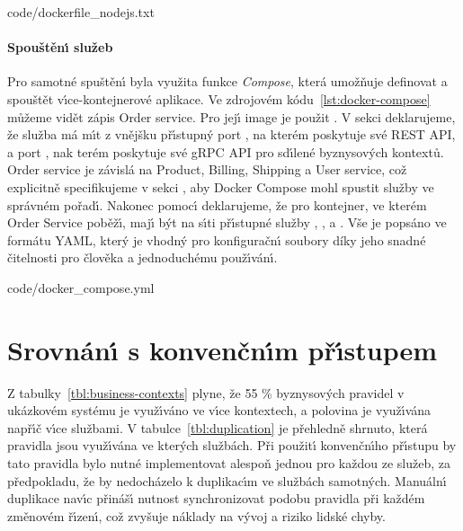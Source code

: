
{code/dockerfile_nodejs.txt}

\paragraph{Spouštěn\'{\i} služeb}
Pro samotné spuštěn\'{\i} byla využita funkce \textit{Compose}, která umožňuje
definovat a spouštět v\'{\i}ce-kontejnerové aplikace. Ve zdrojovém kódu~\ref{lst:docker-compose}
můžeme vidět zápis Order service. Pro jej\'{\i} image je použit .
V sekci  deklarujeme, že služba má m\'{\i}t z vnějšku př\'{\i}stupn\'y port , na kterém poskytuje své
\gls{REST} \gls{API}, a port , nak terém poskytuje své gRPC \gls{API} pro sd\'{\i}lené byznysov\'ych kontextů. Order service je závislá
na Product, Billing, Shipping a User service, což explicitně specifikujeme v sekci ,
aby Docker Compose mohl spustit služby ve správném pořad\'{\i}. Nakonec pomoc\'{\i}  deklarujeme,
že pro kontejner, ve kterém Order Service poběž\'{\i}, maj\'{\i} b\'yt na s\'{\i}ti př\'{\i}stupné služby , ,
 a . Vše je popsáno ve formátu \gls{YAML}, kter\'y je vhodný
pro konfiguračn\'{\i} soubory díky jeho snadné čitelnosti pro člověka a jednoduchému použ\'{\i}ván\'{\i}.


{code/docker_compose.yml}

\section{Srovnán\'{\i} s konvenčn\'{\i}m př\'{\i}stupem}

Z tabulky~\ref{tbl:business-contexts} plyne, že 55 \% byznysov\'ych pravidel v ukázkovém systému je
využ\'{\i}váno ve v\'{\i}ce kontextech, a polovina je využ\'{\i}vána např\'{\i}č v\'{\i}ce službami.
V tabulce~\ref{tbl:duplication} je přehledně shrnuto, která pravidla jsou využ\'{\i}vána ve kter\'ych službách.
Při použit\'{\i} konvenčn\'{\i}ho př\'{\i}stupu by tato pravidla bylo nutné implementovat alespoň
jednou pro každou ze služeb, za předpokladu, že by nedocházelo k duplikac\'{\i}m ve službách samotn\'ych.
Manuáln\'{\i} duplikace nav\'{\i}c přináš\'{\i} nutnost synchronizovat podobu pravidla při každém změnovém
ř\'{\i}zen\'{\i}, což zvyšuje náklady na v\'yvoj a riziko lidské chyby.

